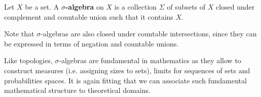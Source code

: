\documentclass[11pt,letterpaper,fleqn]{memoir} %
\begin{document}
\begin{mathSection}
	\begin{defn}
		Let $X$ be a set. A \textbf{$\sigma$-algebra} on $X$ is a collection $\Sigma$ of subsets of $X$ closed under complement and countable union such that it contains $X$.
	\end{defn}
\end{mathSection}

Note that $\sigma$-algebras are also closed under countable intersections, since they can be expressed in terms of negation and countable unions.

Like topologies, $\sigma$-algebras are fundamental in mathematics as they allow to construct measures (i.e. assigning sizes to sets), limits for sequences of sets and probabilities spaces. It is again fitting that we can associate such fundamental mathematical structure to theoretical domains.
\end{document}
